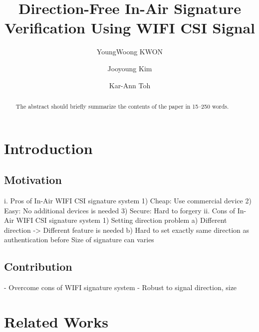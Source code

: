 \documentclass[runningheads]{llncs}
\begin{document}
%
\title{Direction-Free In-Air Signature Verification Using WIFI CSI Signal}
%
%
\author{YoungWoong KWON \and
Jooyoung Kim \and
Kar-Ann Toh}
%
%
%
\maketitle              %
%
\begin{abstract}
The abstract should briefly summarize the contents of the paper in
15--250 words.

\end{abstract}
%
%
%
\section{Introduction}

\subsection{Motivation}
i. Pros of In-Air WIFI CSI signature system
1) Cheap: Use commercial device
2) Easy: No additional devices is needed
3) Secure: Hard to forgery
ii. Cons of In-Air WIFI CSI signature system
1) Setting direction problem
a) Different direction -> Different feature is needed
b) Hard to set exactly same direction as authentication before
Size of signature can varies

\subsection{Contribution}
- Overcome cons of WIFI signature system
- Robust to signal direction, size

\section{Related Works}
\end{document}

